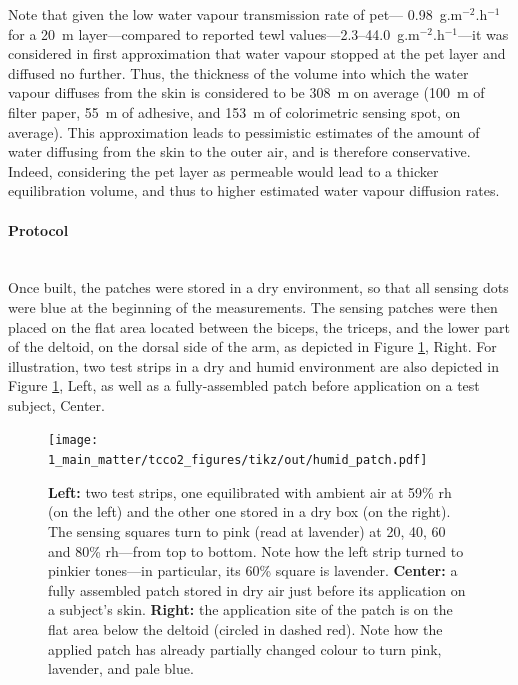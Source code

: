 %

Note that given the low water vapour transmission rate of \gls{pet}---\ie{} 0.98~g.m$^{-2}$.h$^{-1}$ for a 20~{\textmu}m layer\cite{tock1983}---compared to reported \gls{tewl} values---2.3--44.0~g.m$^{-2}$.h$^{-1}$\cite{kottner2013, akdeniz2018}---it was considered in first approximation that water vapour stopped at the \gls{pet} layer and diffused no further. Thus, the thickness of the volume into which the water vapour diffuses from the skin is considered to be 308~{\textmu}m on average (100~{\textmu}m of filter paper, 55~{\textmu}m of adhesive, and 153~{\textmu}m of colorimetric sensing spot, on average). This approximation leads to pessimistic estimates of the amount of water diffusing from the skin to the outer air, and is therefore conservative. Indeed, considering the \gls{pet} layer as permeable would lead to a thicker equilibration volume, and thus to higher estimated water vapour diffusion rates.

\paragraph{Protocol}\mbox{}\\

Once built, the patches were stored in a dry environment, so that all sensing dots were blue at the beginning of the measurements. The sensing patches were then placed on the flat area located between the biceps, the triceps, and the lower part of the deltoid, on the dorsal side of the arm, as depicted in Figure \ref{fig:tcco2:patch_protoc}, Right. For illustration, two test strips in a dry and humid environment are also depicted in Figure \ref{fig:tcco2:patch_protoc}, Left, as well as a fully-assembled patch before application on a test subject, Center.

\begin{figure}
	\centering
	\texttt{[image: 1\_main\_matter/tcco2\_figures/tikz/out/humid\_patch.pdf]}
	\caption[Colorimetric humidity sensing patch pictures.]{\textbf{Left:} two test strips, one equilibrated with ambient air at 59\% \gls{rh} (on the left) and the other one stored in a dry box (on the right). The sensing squares turn to pink (read at lavender) at 20, 40, 60 and 80\% \gls{rh}---from top to bottom. Note how the left strip turned to pinkier tones---in particular, its 60\% square is lavender. \textbf{Center:} a fully assembled patch stored in dry air just before its application on a subject's skin. \textbf{Right:} the application site of the patch is on the flat area below the deltoid (circled in dashed red). Note how the applied patch has already partially changed colour to turn pink, lavender, and pale blue.}
	\label{fig:tcco2:patch_protoc}
\end{figure}

